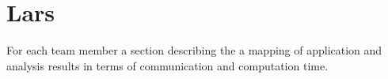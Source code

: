 \documentclass[final]{report}
\begin{document}
\section{Lars}
For each team member a section describing the a mapping of application and analysis results in terms of communication and computation time.
\end{document}
